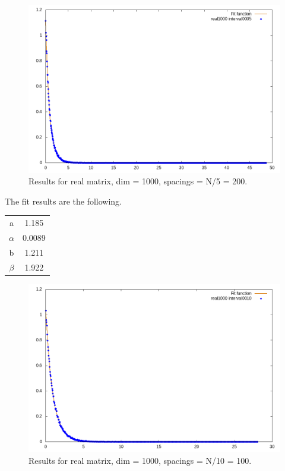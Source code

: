 \documentclass[12pt, a4paper, notitlepage]{report}
\begin{document}
\begin{figure}[H]
	\centering
	\includegraphics[scale=0.6]{./Real_1000/hist_interval_0200_fit.png} 
	\caption{Results for real matrix, dim = 1000, spacings = N/5 = 200.}
	\label{figure_lambdas}
\end{figure}

The fit results are the following.

\begin{table}[H]
	\centering
	\begin{tabular}{|c|c|}
		
		\hline
    
		a			& 1.185	\\
		$\alpha$	& 0.0089	\\
		b			& 1.211	\\
		$\beta$		& 1.922	\\
		
		\hline
		
	\end{tabular}
\end{table}

\newpage

\begin{figure}[H]
	\centering
	\includegraphics[scale=0.6]{./Real_1000/hist_interval_0100_fit.png} 
	\caption{Results for real matrix, dim = 1000, spacings = N/10 = 100.}
	\label{figure_lambdas}
\end{figure}
\end{document}
